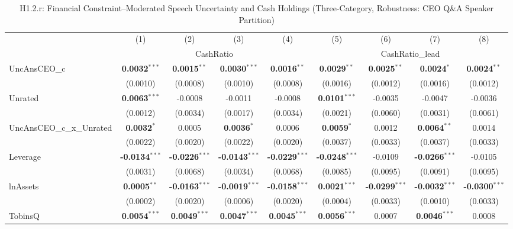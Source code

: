\begin{landscape}
\begin{table}[H]
\setlength{\tabcolsep}{3pt}
\renewcommand{\arraystretch}{0.85}
\centering
\caption{H1.2.r: Financial Constraint--Moderated Speech Uncertainty and Cash Holdings (Three-Category, Robustness: CEO Q\&A Speaker Partition)}
\label{tab:h1_2_robust}
\scriptsize
\begin{tabular}{lcccccccc}
\toprule
 & (1) & (2) & (3) & (4) & (5) & (6) & (7) & (8) \\
 & \multicolumn{4}{c}{CashRatio} & \multicolumn{4}{c}{CashRatio\_lead} \\
\cmidrule(lr){2-5} \cmidrule(lr){6-9}
\midrule
UncAnsCEO\_c & \textbf{0.0032}$^{***}$ & \textbf{0.0015}$^{**}$ & \textbf{0.0030}$^{***}$ & \textbf{0.0016}$^{**}$ & \textbf{0.0029}$^{**}$ & \textbf{0.0025}$^{**}$ & \textbf{0.0024}$^{*}$ & \textbf{0.0024}$^{**}$ \\
 & (0.0010) & (0.0008) & (0.0010) & (0.0008) & (0.0016) & (0.0012) & (0.0016) & (0.0012) \\
Unrated & \textbf{0.0063}$^{***}$ & -0.0008 & -0.0011 & -0.0008 & \textbf{0.0101}$^{***}$ & -0.0035 & -0.0047 & -0.0036 \\
 & (0.0012) & (0.0034) & (0.0017) & (0.0034) & (0.0021) & (0.0060) & (0.0031) & (0.0061) \\
UncAnsCEO\_c\_x\_Unrated & \textbf{0.0032}$^{*}$ & 0.0005 & \textbf{0.0036}$^{*}$ & 0.0006 & \textbf{0.0059}$^{*}$ & 0.0012 & \textbf{0.0064}$^{**}$ & 0.0014 \\
 & (0.0022) & (0.0020) & (0.0022) & (0.0020) & (0.0037) & (0.0033) & (0.0037) & (0.0033) \\
\midrule
Leverage & \textbf{-0.0134}$^{***}$ & \textbf{-0.0226}$^{***}$ & \textbf{-0.0143}$^{***}$ & \textbf{-0.0229}$^{***}$ & \textbf{-0.0248}$^{***}$ & -0.0109 & \textbf{-0.0266}$^{***}$ & -0.0105 \\
 & (0.0031) & (0.0068) & (0.0034) & (0.0068) & (0.0085) & (0.0095) & (0.0091) & (0.0095) \\
lnAssets & \textbf{0.0005}$^{**}$ & \textbf{-0.0163}$^{***}$ & \textbf{-0.0019}$^{***}$ & \textbf{-0.0158}$^{***}$ & \textbf{0.0021}$^{***}$ & \textbf{-0.0299}$^{***}$ & \textbf{-0.0032}$^{***}$ & \textbf{-0.0300}$^{***}$ \\
 & (0.0002) & (0.0020) & (0.0006) & (0.0020) & (0.0004) & (0.0033) & (0.0010) & (0.0033) \\
TobinsQ & \textbf{0.0054}$^{***}$ & \textbf{0.0049}$^{***}$ & \textbf{0.0047}$^{***}$ & \textbf{0.0045}$^{***}$ & \textbf{0.0056}$^{***}$ & 0.0007 & \textbf{0.0046}$^{***}$ & 0.0008 \\

\end{tabular}
\end{table}
\end{landscape}
